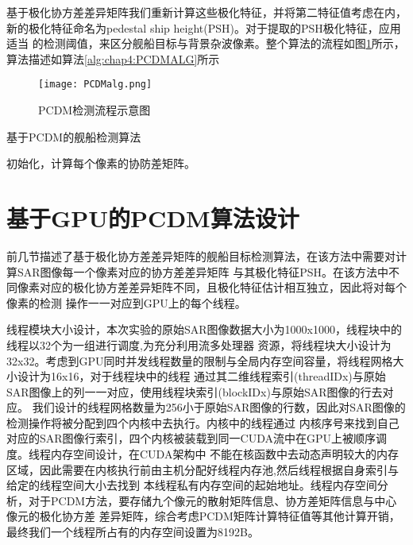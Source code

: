       基于极化协方差差异矩阵我们重新计算这些极化特征，并将第二特征值考虑在内，新的极化特征命名为pedestal ship height(PSH)。对于提取的PSH极化特征，应用适当
      的检测阈值，来区分舰船目标与背景杂波像素。整个算法的流程如图\ref{fig:chap4:PCDMalg}所示，算法描述如算法\ref{alg:chap4:PCDMALG}所示

    \begin{figure}[H] %
      \centering
      \texttt{[image: PCDMalg.png]}
      \caption{PCDM检测流程示意图}
      \label{fig:chap4:PCDMalg}
    \end{figure}

    \begin{algorithm}[t]
      \caption{基于PCDM的舰船检测算法}
      \label{alg:chap4:PCDMALG}
      \BlankLine
      初始化，计算每个像素的协防差矩阵。

    \end{algorithm}

\section{基于GPU的PCDM算法设计}
      
      前几节描述了基于极化协方差差异矩阵的舰船目标检测算法，在该方法中需要对计算SAR图像每一个像素对应的协方差差异矩阵
      与其极化特征PSH。在该方法中不同像素对应的极化协方差差异矩阵不同，且极化特征估计相互独立，因此将对每个像素的检测
      操作一一对应到GPU上的每个线程。

      线程模块大小设计，本次实验的原始SAR图像数据大小为1000x1000，线程块中的线程以32个为一组进行调度,为充分利用流多处理器
      资源，将线程块大小设计为32x32。考虑到GPU同时并发线程数量的限制与全局内存空间容量，将线程网格大小设计为16x16，对于线程块中的线程
      通过其二维线程索引(threadIDx)与原始SAR图像上的列一一对应，使用线程块索引(blockIDx)与原始SAR图像的行去对应。
      我们设计的线程网格数量为256小于原始SAR图像的行数，因此对SAR图像的检测操作将被分配到四个内核中去执行。内核中的线程通过
      内核序号来找到自己对应的SAR图像行索引，四个内核被装载到同一CUDA流中在GPU上被顺序调度。线程内存空间设计，在CUDA架构中
      不能在核函数中去动态声明较大的内存区域，因此需要在内核执行前由主机分配好线程内存池,然后线程根据自身索引与给定的线程空间大小去找到
      本线程私有内存空间的起始地址。线程内存空间分析，对于PCDM方法，要存储九个像元的散射矩阵信息、协方差矩阵信息与中心像元的极化协方差
      差异矩阵，综合考虑PCDM矩阵计算特征值等其他计算开销，最终我们一个线程所占有的内存空间设置为8192B。

